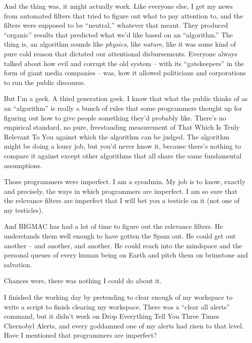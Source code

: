 And the thing was, it might actually work. Like everyone else, I get my 
news from automated filters that tried to figure out what to pay 
attention to, and the filters were supposed to be “neutral,” 
whatever that meant. They produced “organic” results that predicted 
what we'd like based on an “algorithm.” The thing is, an algorithm 
sounds like \emph{physics}, like \emph{nature}, like it was some kind 
of pure cold reason that dictated our attentional disbursements. 
Everyone always talked about how evil and corrupt the old system -- 
with its “gatekeepers” in the form of giant media companies -- was, 
how it allowed politicians and corporations to run the public discourse.

But I'm a geek. A third generation geek. I know that what the public 
thinks of as an “algorithm” is really a bunch of rules that some 
programmers thought up for figuring out how to give people something 
they'd probably like. There's no empirical standard, no pure, 
freestanding measurement of That Which Is Truly Relevant To You against 
which the algorithm can be judged. The algorithm might be doing a lousy 
job, but you'd never know it, because there's nothing to compare it 
against except other algorithms that all share the same fundamental 
assumptions.

Those programmers were imperfect. I am a sysadmin. My job is to know, 
exactly and precisely, the ways in which programmers are imperfect. I 
am so sure that the relevance filters are imperfect that I will bet you 
a testicle on it (not one of my testicles).

And BIGMAC has had a lot of time to figure out the relevance filters. 
He understands them well enough to have gotten the Spam out. He could 
get out another -- and another, and another. He could reach into the 
mindspace and the personal queues of every human being on Earth and 
pitch them on brimstone and salvation.

Chances were, there was nothing I could do about it.

\tb

I finished the working day by pretending to clear enough of my 
workspace to write a script to finish clearing my workspace. There was 
a “clear all alerts” command, but it didn't work on Drop Everything 
Tell You Three Times Chernobyl Alerts, and every goddamned one of my 
alerts had risen to that level. Have I mentioned that programmers are 
imperfect?

